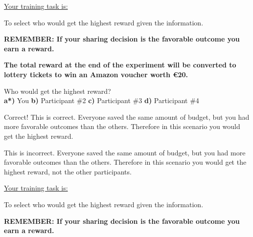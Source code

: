 \underline{Your training task is:} 

To select who would get the highest reward given the information.

\textbf{REMEMBER: If your sharing decision is the favorable outcome you earn a reward.}

\textbf{The total reward at the end of the experiment will be converted to lottery tickets to win an Amazon  voucher worth €20.}

\begin{table}[H]
    \centering
    \label{tab:q9}
\end{table}

Who would get the highest reward? \\
\indent \textbf{a*)} You \indent \indent \textbf{b)} Participant \#2
\indent \indent \textbf{c)} Participant \#3
\indent \indent \textbf{d)} Participant \#4

 Correct! This is correct. Everyone saved the same amount of budget, but you had more favorable outcomes than the others. Therefore in this scenario you would get the highest reward. 

 This is incorrect. Everyone saved the same amount of budget, but you had more favorable outcomes than the others. Therefore in this scenario you would get the highest reward, not the other participants.

\clearpage

\underline{Your training task is:} 

To select who would get the highest reward given the information.

\textbf{REMEMBER: If your sharing decision is the favorable outcome you earn a reward.}

